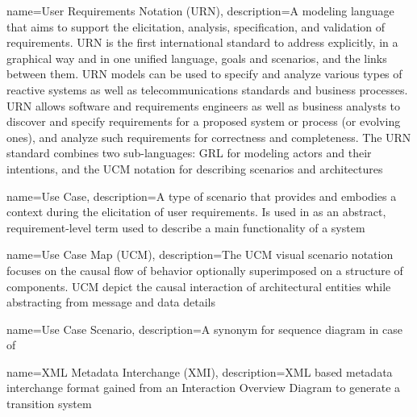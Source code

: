 {
	name={User Requirements Notation (URN)},
	description={A modeling language that aims to support the elicitation, analysis, specification, and validation of requirements. URN is the first international standard to address explicitly, in a graphical way and in one unified language, goals and scenarios, and the links between them. URN models can be used to specify and analyze various types of reactive systems as well as telecommunications standards and business processes. URN allows software and requirements engineers as well as business analysts to discover and specify requirements for a proposed system or process (or evolving ones), and analyze such requirements for correctness and completeness. The URN standard combines two sub-languages: GRL for modeling actors and their intentions, and the UCM notation for describing scenarios and architectures \cite{Amyot2011}}
}

{
	name={Use Case},
	description={A type of scenario that provides and embodies a context during the elicitation of user requirements. Is used in \cite{ClementineNebut2006} as an abstract, requirement-level term used to describe a main functionality of a system \cite{SWEBOK, ClementineNebut2006}}
}

{
	name={Use Case Map (UCM)},
	description={The UCM visual scenario notation focuses on the causal flow of behavior optionally superimposed on a structure of components. UCM depict the causal interaction of architectural entities while abstracting from message and data details \cite{Amyot2011}}
}

{
	name={Use Case Scenario},
	description={A synonym for sequence diagram in case of \cite{ClementineNebut2006}}
}

{
	name={XML Metadata Interchange (XMI)},
	description={XML based metadata interchange format gained from an Interaction Overview Diagram to generate a transition system \cite{NajlaRaza2007}}
}

